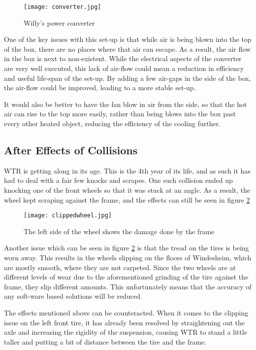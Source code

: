 \begin{figure}[H]
\centering
\texttt{[image: converter.jpg]}
\caption{Willy's power converter}
\label{fig::converter}
\end{figure}

One of the key issues with this set-up is that while air is being blown into the top of the box, there are no places where that air can escape.
As a result, the air flow in the box is next to non-existent.
While the electrical aspects of the converter are very well executed, this lack of air-flow could mean a reduction in efficiency and useful life-span of the set-up.
By adding a few air-gaps in the side of the box, the air-flow could be improved, leading to a more stable set-up.

It would also be better to have the fan blow in air from the side, so that the hot air can rise to the top more easily, rather than being blows into the box past every other heated object, reducing the efficiency of the cooling further.


\subsection{After Effects of Collisions}
WTR is getting along in its age.
This is the 4th year of its life, and as such it has had to deal with a fair few knocks and scrapes.
One such collision ended up knocking one of the front wheels so that it was stuck at an angle.
As a result, the wheel kept scraping against the frame, and the effects can still be seen in figure \ref{fig::wheelclip}

\begin{figure}[H]
\centering
\texttt{[image: clippedwheel.jpg]}
\caption{The left side of the wheel shows the damage done by the frame}
\label{fig::wheelclip}
\end{figure}

Another issue which can be seen in figure \ref{fig::wheelclip} is that the tread on the tires is being worn away.
This results in the wheels slipping on the floors of Windesheim, which are mostly smooth, where they are not carpeted.
Since the two wheels are at different levels of wear due to the aforementioned grinding of the tire against the frame, they slip different amounts.
This unfortunately means that the accuracy of any soft-ware based solutions will be reduced.

The effects mentioned above can be counteracted.
When it comes to the clipping issue on the left front tire, it has already been resolved by straightening out the axle and increasing the rigidity of the suspension, causing WTR to stand a little taller and putting a bit of distance between the tire and the frame.

